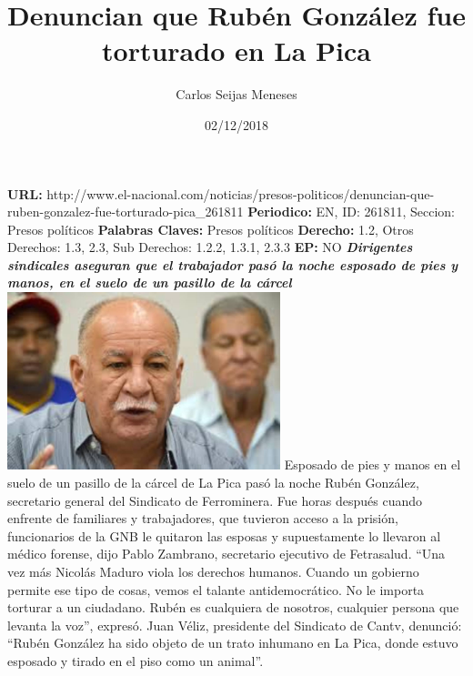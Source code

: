 \documentclass{article}%
\title{\textbf{Denuncian que Rubén González fue torturado en La Pica}}%
\author{Carlos Seijas Meneses}%
\date{02/12/2018}%
\begin{document}
%
\normalsize%
\maketitle%
\textbf{URL: }%
http://www.el{-}nacional.com/noticias/presos{-}politicos/denuncian{-}que{-}ruben{-}gonzalez{-}fue{-}torturado{-}pica\_261811\newline%
%
\textbf{Periodico: }%
EN, %
ID: %
261811, %
Seccion: %
Presos políticos\newline%
%
\textbf{Palabras Claves: }%
Presos políticos\newline%
%
\textbf{Derecho: }%
1.2, %
Otros Derechos: %
1.3, 2.3, %
Sub Derechos: %
1.2.2, 1.3.1, 2.3.3\newline%
%
\textbf{EP: }%
NO\newline%
\newline%
%
\textbf{\textit{Dirigentes sindicales aseguran que el trabajador pasó la noche esposado de pies y manos, en el suelo de un pasillo de la cárcel}}%
\newline%
\newline%
%
\includegraphics[width=300px]{187.jpg}%
\newline%
%
Esposado de pies y manos en el suelo de un pasillo de la cárcel de La Pica pasó la noche Rubén González, secretario general del Sindicato de Ferrominera.%
\newline%
%
Fue horas después cuando enfrente de familiares y trabajadores, que tuvieron acceso a la prisión, funcionarios de la GNB le quitaron las esposas y supuestamente lo llevaron al médico forense, dijo Pablo Zambrano, secretario ejecutivo de Fetrasalud. “Una vez más Nicolás Maduro viola los derechos humanos. Cuando un gobierno permite ese tipo de cosas, vemos el talante antidemocrático. No le importa torturar a un ciudadano. Rubén es cualquiera de nosotros, cualquier persona que levanta la voz”, expresó.%
\newline%
%
Juan Véliz, presidente del Sindicato de Cantv, denunció: “Rubén González ha sido objeto de un trato inhumano en La Pica, donde estuvo esposado y tirado en el piso como un animal”.%
\end{document}
